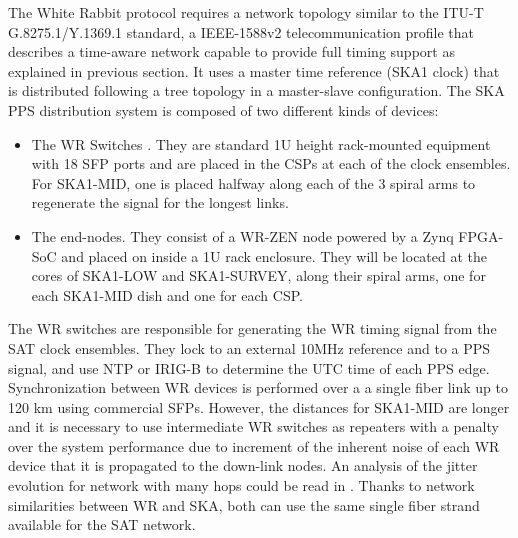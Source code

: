 %
%

The White Rabbit protocol requires a network topology similar to the ITU-T G.8275.1/Y.1369.1 standard, a IEEE-1588v2 telecommunication profile that describes a time-aware network capable to provide full timing support \cite{itu:TG8275_1_Y_1369_1} as explained in previous section. It uses a master time reference (SKA1 clock) that is distributed following a tree topology in a master-slave configuration. The SKA PPS distribution system is composed of two different kinds of devices: 

\begin{itemize}
	\item {The WR Switches \cite{sevensols:wr_switch}. They are standard 1U height rack-mounted equipment with 18 SFP ports and are placed in the CSPs at each of the clock ensembles. For SKA1-MID, one is placed halfway along each of the 3 spiral arms to regenerate the signal for the longest links.}
	\item{The end-nodes. They consist of a WR-ZEN node \cite{sevensols:wr_zen} powered by a Zynq FPGA-SoC and placed on inside a 1U rack enclosure. They will be located at the cores of SKA1-LOW and SKA1-SURVEY, along their spiral arms, one for each SKA1-MID dish and one for each CSP.}
\end{itemize}

The WR switches are responsible for generating the WR timing signal from the SAT clock ensembles. They lock to an external 10MHz reference and to a PPS signal, and use NTP or IRIG-B to determine the UTC time of each PPS edge. Synchronization between WR devices is performed over a a single fiber link up to 120 km using commercial SFPs.
However, the distances for SKA1-MID are longer and it is necessary to use 
intermediate WR switches as repeaters with a penalty over the system 
performance due to increment of the inherent noise of each WR device that it is 
propagated to the down-link nodes. An analysis of the jitter evolution for 
network with many hops could be read in \cite{torres2016scalability}. Thanks to 
network similarities between WR and SKA, both can use the same single fiber 
strand available for the SAT network. 

